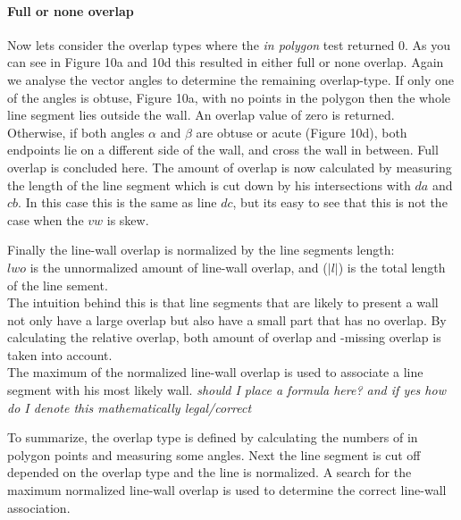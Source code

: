 \documentclass[10pt]{article}
\begin{document}
	\paragraph{Full or none overlap}
	Now lets consider the overlap types where the \emph{in polygon} test
	returned 0.
	As you can see in Figure 10a and 10d this resulted in either full or none overlap.
	Again we analyse the vector angles to determine the remaining overlap-type.
	If only one of the angles is obtuse, Figure 10a, with no points in the polygon 
	then the whole line segment lies outside the wall. An overlap value of zero
	is returned.\\
	Otherwise, if both angles $\alpha$ and $\beta$ are obtuse or acute (Figure 10d),
	both endpoints lie on a different side of the wall, and cross the wall in
	between. Full overlap is concluded here. 
	The amount of overlap is now calculated by measuring the length
	of the line segment which is cut down by his intersections with $da$ and
	$cb$. In this case this is the same as line $dc$, but its easy to see that
	this is not the case when the $vw$ is skew.





	
	Finally the line-wall overlap is normalized by the line segments length:\\
	$lwo$ is the unnormalized amount of line-wall overlap, 
	and ($|l|$) is the total length of the line sement.\\

	The intuition behind this is that line segments that are likely to
	present a wall not only have a large overlap but also have a small part
	that has no overlap. By calculating the relative overlap, both amount of overlap
	and -missing overlap is taken into account.\\

	The maximum of the normalized line-wall overlap is used to associate a
	line segment with his most likely wall.
	\emph{should I place a formula here? and if yes how do I denote this
	mathematically legal/correct}

	To summarize, the overlap type is defined by calculating the numbers of in
	polygon points and measuring some angles. Next the line segment is cut off
	depended on the overlap type and the line is normalized. A search for the
	maximum normalized line-wall overlap is used to determine the correct line-wall
	association.
\end{document}
